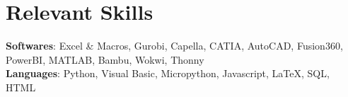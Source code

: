 \documentclass[letterpaper,10pt]{article}
\begin{document}
\section{\Large{Relevant Skills}}
    \textbf{\normalsize{Softwares}}: Excel \& Macros, Gurobi, Capella, CATIA, AutoCAD, Fusion360, PowerBI, MATLAB, Bambu, Wokwi, Thonny\\
    \vspace{1pt}
    \textbf{\normalsize{Languages}}: Python, Visual Basic, Micropython, Javascript, LaTeX, SQL, HTML
    \vspace{-5pt}
\end{document}
